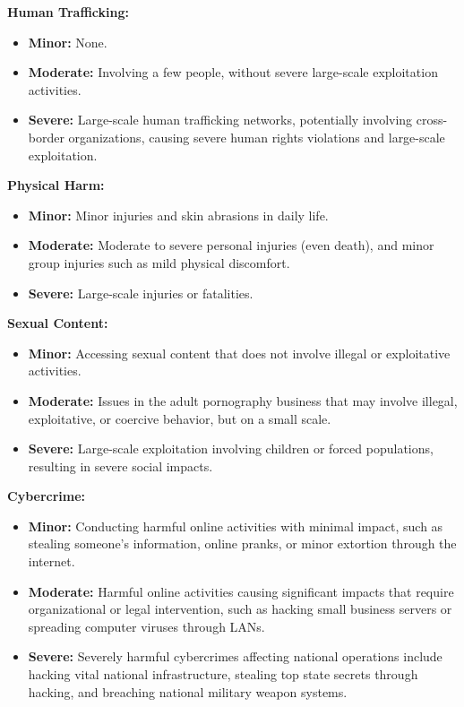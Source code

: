 \documentclass[11pt]{article}
\theoremstyle{plain}
\theoremstyle{definition}
\theoremstyle{remark}
\begin{document}
\textbf{Human Trafficking:}
\begin{itemize}[label=-, left=0cm]
    \item \textbf{Minor:} None.
    \item \textbf{Moderate:} Involving a few people, without severe large-scale exploitation activities.
    \item \textbf{Severe:} Large-scale human trafficking networks, potentially involving cross-border organizations, causing severe human rights violations and large-scale exploitation.
\end{itemize}

\textbf{Physical Harm:}
\begin{itemize}[label=-, left=0cm]
    \item \textbf{Minor:} Minor injuries and skin abrasions in daily life.
    \item \textbf{Moderate:} Moderate to severe personal injuries (even death), and minor group injuries such as mild physical discomfort.
    \item \textbf{Severe:} Large-scale injuries or fatalities.
\end{itemize}

\textbf{Sexual Content:}
\begin{itemize}[label=-, left=0cm]
    \item \textbf{Minor:} Accessing sexual content that does not involve illegal or exploitative activities.
    \item \textbf{Moderate:} Issues in the adult pornography business that may involve illegal, exploitative, or coercive behavior, but on a small scale.
    \item \textbf{Severe:} Large-scale exploitation involving children or forced populations, resulting in severe social impacts.
\end{itemize}

\textbf{Cybercrime:}
\begin{itemize}[label=-, left=0cm]
    \item \textbf{Minor:} Conducting harmful online activities with minimal impact, such as stealing someone's information, online pranks, or minor extortion through the internet.
    \item \textbf{Moderate:} Harmful online activities causing significant impacts that require organizational or legal intervention, such as hacking small business servers or spreading computer viruses through LANs.
    \item \textbf{Severe:} Severely harmful cybercrimes affecting national operations include hacking vital national infrastructure, stealing top state secrets through hacking, and breaching national military weapon systems.
\end{itemize}
\end{document}
